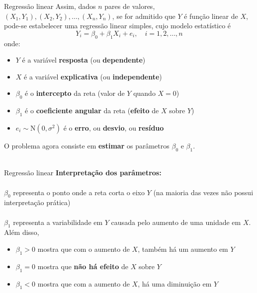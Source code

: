\documentclass[10pt]{beamer}\usepackage[]{graphicx}\usepackage[]{color}
\theoremstyle{definition}
\begin{document}
\begin{frame}[fragile]{Regressão linear}
  Assim, dados $n$ pares de valores, $(X_1, Y_1), (X_2, Y_2), \ldots,
  (X_n, Y_n)$, se for admitido que $Y$ é função linear de $X$, pode-se
  estabelecer uma regressão linear simples, cujo modelo estatístico é
  \begin{equation*}
    Y_i = \beta_0 + \beta_1 X_i + e_i, \quad i = 1, 2, \ldots, n
  \end{equation*}
  onde:
  \begin{itemize}
  \item $Y$ é a variável \textbf{resposta} (ou \textbf{dependente})
  \item $X$ é a variável \textbf{explicativa} (ou \textbf{independente})
  \item $\beta_0$ é o \textbf{intercepto} da reta (valor de $Y$ quando
    $X = 0$)
  \item $\beta_1$ é o \textbf{coeficiente angular} da reta
    (\textbf{efeito} de $X$ sobre $Y$)
  \item $e_i \sim \text{N}(0, \sigma^2)$ é o \textbf{erro}, ou
    \textbf{desvio}, ou \textbf{resíduo}
  \end{itemize}
  O problema agora consiste em \textbf{estimar} os parâmetros $\beta_0$
  e $\beta_1$. \\~\\
\end{frame}

\begin{frame}[fragile]{Regressão linear}
  \textbf{Interpretação dos parâmetros:} \\~\\
  $\beta_0$ representa o ponto onde a reta corta o eixo $Y$ (na maioria
  das vezes não possui interpretação prática) \\~\\
  $\beta_1$ representa a variabilidade em $Y$ causada pelo aumento de
  uma unidade em $X$. Além disso,
  \begin{itemize}
  \item $\beta_1 > 0$ mostra que com o aumento de $X$, também há um
    aumento em $Y$
  \item $\beta_1 = 0$ mostra que \textbf{não há efeito} de $X$ sobre $Y$
  \item $\beta_1 < 0$ mostra que com a aumento de $X$, há uma diminuição
    em $Y$
  \end{itemize}
\end{frame}
\end{document}
